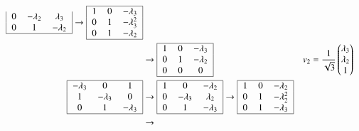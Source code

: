 \begin{loesung}
\begin{align*}
\begin{tabular}{|>{$}c<{$}>{$}c<{$}>{$}c<{$}|}
        0&-\lambda_2& \lambda_3\\
        0&         1&-\lambda_2\\
\hline
\end{tabular}
\rightarrow
\begin{tabular}{|>{$}c<{$}>{$}c<{$}>{$}c<{$}|}
\hline
        1&        0&-\lambda_3  \\
        0&        1&-\lambda_3^2\\
        0&        1&-\lambda_2  \\
\hline
\end{tabular}
\\
&\rightarrow
\begin{tabular}{|>{$}c<{$}>{$}c<{$}>{$}c<{$}|}
\hline
        1&        0&-\lambda_3\\
        0&        1&-\lambda_2\\
        0&        0&         0\\
\hline
\end{tabular}
&
v_2&=\frac1{\sqrt{3}}\begin{pmatrix}\lambda_3\\\lambda_2\\1\end{pmatrix}
\\
\begin{tabular}{|>{$}c<{$}>{$}c<{$}>{$}c<{$}|}
\hline
-\lambda_3&         0&         1\\
         1&-\lambda_3&         0\\
         0&         1&-\lambda_3\\
\hline
\end{tabular}
&
\rightarrow
\begin{tabular}{|>{$}c<{$}>{$}c<{$}>{$}c<{$}|}
\hline
        1&         0&-\lambda_2\\
        0&-\lambda_3& \lambda_2\\
        0&         1&-\lambda_3\\
\hline
\end{tabular}
\rightarrow
\begin{tabular}{|>{$}c<{$}>{$}c<{$}>{$}c<{$}|}
\hline
        1&        0&-\lambda_2  \\
        0&        1&-\lambda_2^2\\
        0&        1&-\lambda_3  \\
\hline
\end{tabular}
\\
&\rightarrow
\begin{tabular}{|>{$}c<{$}>{$}c<{$}>{$}c<{$}|}

\end{tabular}
\end{align*}
\end{loesung}
